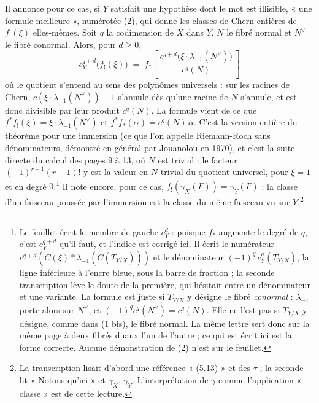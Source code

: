\documentclass[11pt,a4paper]{article}
\begin{document}
Il annonce pour ce cas, si $Y$ satisfait une hypothèse dont le mot est
illisible, « une formule meilleure », numérotée (2), qui donne les classes de
Chern entières de $f_{!}(\xi)$ elles-mêmes. Soit $q$ la codimension de $X$
dans $Y$, $N$ le fibré normal et $N^{\vee}$ le fibré conormal. Alors, pour
$d \geqslant 0$,
\begin{equation*}
  c^{q+d}_{Y}\bigl(f_{!}(\xi)\bigr)
  \;=\; f_{*}\!\left[\,\frac{c^{q+d}\bigl(\xi \cdot
  \lambda_{-1}(N^{\vee})\bigr)}{c^{q}(N)}\,\right]
  \tag{2}
\end{equation*}
où le quotient s'entend au sens des polynômes universels : sur les racines de
Chern, $c(\xi \cdot \lambda_{-1}(N^{\vee})) - 1$ s'annule dès qu'une racine de
$N$ s'annule, et est donc divisible par leur produit $c^{q}(N)$. La formule
vient de ce que $f^{*}f_{!}(\xi) = \xi \cdot \lambda_{-1}(N^{\vee})$ et
$f^{*}f_{*}(\alpha) = c^{q}(N)\,\alpha$. C'est la version entière du théorème
pour une immersion (ce que l'on appelle Riemann-Roch sans dénominateurs,
démontré en général par Jouanolou en 1970), et c'est la suite directe du
calcul des pages 9 à 13, où $N$ est trivial : le facteur $(-1)^{r-1}(r-1)!$ y est la valeur en
$N$ trivial du quotient universel, pour $\xi = 1$ et en degré $0$.\footnote{Le feuillet écrit le membre de gauche $c^{d}_{Y}$ :
puisque $f_{*}$ augmente le degré de $q$, c'est $c^{q+d}_{Y}$ qu'il faut, et
l'indice est corrigé ici. Il écrit le numérateur $c^{q+d}(\widetilde{C}(\xi)
\ast \lambda_{-1}(\widetilde{C}(T_{Y/X})))$ et le dénominateur
$(-1)^{q}\,c^{q}_{Y}(T_{Y/X})$, la ligne inférieure à l'encre bleue, sous la
barre de fraction ; la seconde transcription lève le doute de la première,
qui hésitait entre un dénominateur et une variante. La formule est juste si
$T_{Y/X}$ y désigne le fibré \emph{conormal} : $\lambda_{-1}$ porte alors sur
$N^{\vee}$, et $(-1)^{q}c^{q}(N^{\vee}) = c^{q}(N)$. Elle ne l'est pas si
$T_{Y/X}$ y désigne, comme dans (1 bis), le fibré normal. La même lettre sert
donc sur la même page à deux fibrés duaux l'un de l'autre ; ce qui est écrit
ici est la forme correcte. Aucune démonstration de (2) n'est sur le feuillet.}
Il note encore, pour ce cas, $f_{!}(\gamma_{X}(F)) = \gamma_{Y}(F)$ : la
classe d'un faisceau poussée par l'immersion est la classe du même faisceau
vu sur $Y$.\footnote{La transcription lisait d'abord une référence « (5.13) »
et des $\tau$ ; la seconde lit « Notons qu'ici » et $\gamma_{X}$, $\gamma_{Y}$.
L'interprétation de $\gamma$ comme l'application « classe » est de cette
lecture.}
\end{document}
